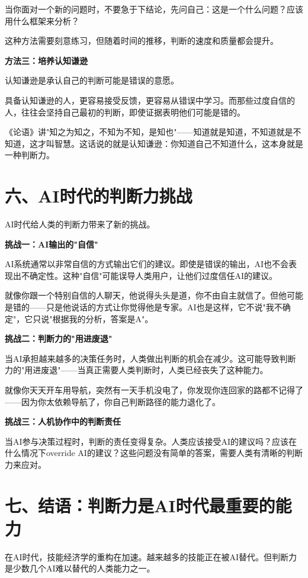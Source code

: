 当你面对一个新的问题时，不要急于下结论，先问自己：这是一个什么问题？应该用什么框架来分析？

这种方法需要刻意练习，但随着时间的推移，判断的速度和质量都会提升。

\textbf{方法三：培养认知谦逊}

认知谦逊是承认自己的判断可能是错误的意愿。

具备认知谦逊的人，更容易接受反馈，更容易从错误中学习。而那些过度自信的人，往往会坚持自己最初的判断，即使证据表明他们可能是错的。

《论语》讲"知之为知之，不知为不知，是知也"——知道就是知道，不知道就是不知道，这才叫智慧。这话说的就是认知谦逊：你知道自己不知道什么，这本身就是一种判断力。

\section{六、AI时代的判断力挑战}


AI时代给人类的判断力带来了新的挑战。

\textbf{挑战一：AI输出的"自信"}

AI系统通常以非常自信的方式输出它们的建议。即使是错误的输出，AI也不会表现出不确定性。这种"自信"可能误导人类用户，让他们过度信任AI的建议。

就像你跟一个特别自信的人聊天，他说得头头是道，你不由自主就信了。但他可能是错的——只是他说话的方式让你觉得他是专家。AI也是这样，它不说"我不确定"，它只说"根据我的分析，答案是A"。

\textbf{挑战二：判断力的"用进废退"}

当AI承担越来越多的决策任务时，人类做出判断的机会在减少。这可能导致判断力的"用进废退"——当真正需要人类判断时，人类已经丧失了这种能力。

就像你天天开车用导航，突然有一天手机没电了，你发现你连回家的路都不记得了——因为你太依赖导航了，你自己判断路径的能力退化了。

\textbf{挑战三：人机协作中的判断责任}

当AI参与决策过程时，判断的责任变得复杂。人类应该接受AI的建议吗？应该在什么情况下override AI的建议？这些问题没有简单的答案，需要人类有清晰的判断力来应对。

\section{七、结语：判断力是AI时代最重要的能力}


在AI时代，技能经济学的重构在加速。越来越多的技能正在被AI替代。但判断力是少数几个AI难以替代的人类能力之一。

